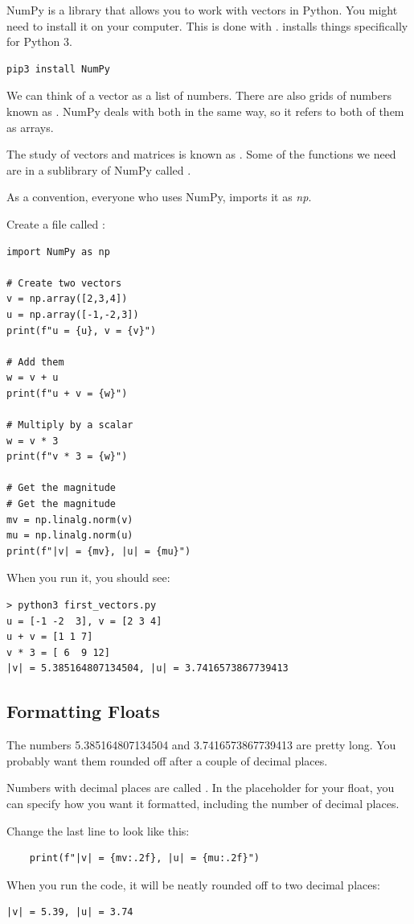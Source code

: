 NumPy is a library that allows you to work with vectors in Python.  
You might need to install it on your computer. This is done with . 
 installs things specifically for Python 3.

\begin{Verbatim}
pip3 install NumPy
\end{Verbatim}

We can think of a vector as a list of numbers.  
There are also grids of numbers known as . NumPy deals with both in the same way, 
so it refers to both of them as arrays.

The study of vectors and matrices is known as . Some of the functions we need
are in a sublibrary of NumPy called . 

As a convention, everyone who uses NumPy, imports it as \textit{np}. 

Create a file called :

\begin{Verbatim}
import NumPy as np

# Create two vectors
v = np.array([2,3,4])
u = np.array([-1,-2,3])
print(f"u = {u}, v = {v}")

# Add them
w = v + u
print(f"u + v = {w}")

# Multiply by a scalar
w = v * 3
print(f"v * 3 = {w}")

# Get the magnitude
# Get the magnitude
mv = np.linalg.norm(v)
mu = np.linalg.norm(u)
print(f"|v| = {mv}, |u| = {mu}")
\end{Verbatim}

When you run it, you should see:

\begin{Verbatim}
> python3 first_vectors.py
u = [-1 -2  3], v = [2 3 4]
u + v = [1 1 7]
v * 3 = [ 6  9 12]
|v| = 5.385164807134504, |u| = 3.7416573867739413
\end{Verbatim}

\subsection{Formatting Floats}

The numbers 5.385164807134504 and 3.7416573867739413 are pretty long.  You probably want them 
rounded off after a couple of decimal places.

Numbers with decimal places are called . In the placeholder for your float, you 
can specify how you want it formatted, including the number of decimal places.

Change the last line to look like this:
\begin{Verbatim}
    print(f"|v| = {mv:.2f}, |u| = {mu:.2f}")
\end{Verbatim}

When you run the code, it will be neatly rounded off to two decimal places:
\begin{Verbatim}
|v| = 5.39, |u| = 3.74
\end{Verbatim}
